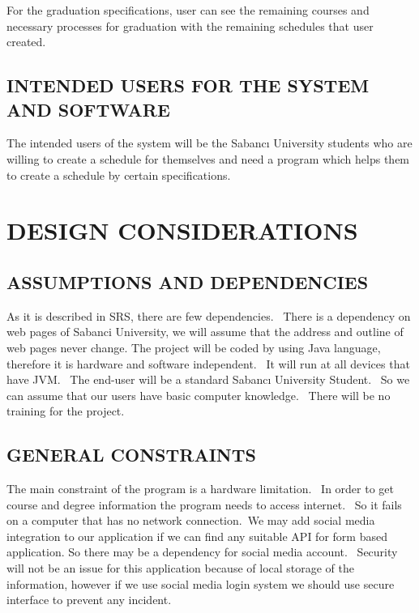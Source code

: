 \documentclass[twoside,letterpaper]{article}
\begin{document}
\noindent
For the graduation specifications, user can see the remaining courses and necessary processes for graduation with the remaining schedules that user created.

\subsection{INTENDED USERS FOR THE SYSTEM AND SOFTWARE}

The intended users of the system will be the Sabanc\i{} University students who are willing to create a schedule for themselves and need a program which helps them to create a schedule by certain specifications.

\clearpage\pagestyle{Standard}
\section{DESIGN CONSIDERATIONS}
\label{sec:considerations}
\subsection{ASSUMPTIONS AND DEPENDENCIES}

As it is described in SRS, there are few dependencies. \ There is a dependency on web pages of Sabanci University, we will assume that the address and outline of web pages never change. The project will be coded by using Java language, therefore it is hardware and software independent. \  It will run at all devices that have JVM. \ The end-user will be a standard Sabanc\i{} University Student. \ So we can assume that our users have basic computer knowledge. \ There will be no training for the project. 

\subsection{GENERAL CONSTRAINTS}

The main constraint of the program is a hardware limitation. \ In order to get course and degree information the program needs to access internet. \ So it fails on a computer that has no network connection.\ We may add social media integration to our application if we can find any suitable API for form based application. So there may be a dependency for social media account. \ Security will not be an issue for this application because of local storage of the information, however if we use social media login system we should use secure interface to prevent any incident.
\end{document}
